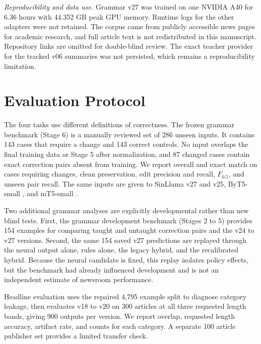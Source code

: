 \documentclass[a4paper,conference]{IEEEtran}
\begin{document}
\textit{Reproducibility and data use.} Grammar v27 was trained on one NVIDIA
A40 for 6.36 hours with 44.352 GB peak GPU memory. Runtime logs for the other
adapters were not retained. The corpus came from publicly accessible news pages
for academic research, and full article text is not redistributed in this
manuscript. Repository links are omitted for double-blind review. The exact
teacher provider for the tracked v06 summaries was not persisted, which remains
a reproducibility limitation.

\section{Evaluation Protocol}
\label{sec:evalprotocol}
The four tasks use different definitions of correctness. The frozen grammar benchmark (Stage 6) is a
manually reviewed set of 286 unseen inputs. It contains
143 cases that require a change and 143 correct controls. No input overlaps the
final training data or Stage 5 after normalization, and 87 changed cases contain
exact correction pairs absent from training. We report overall and
exact match on cases requiring changes, clean preservation, edit precision and recall,
$F_{0.5}$, and unseen pair recall. The same inputs are given to SinLlama v27 and
v25, ByT5-small \cite{xue2022byt5}, and mT5-small \cite{xue2021mt5}.

Two additional grammar analyses are explicitly developmental rather than new
blind tests. First, the grammar development benchmark (Stages 2 to 5) provides 154 examples
for comparing taught and untaught correction pairs and the v24 to v27 versions. Second, the
same 154 saved v27 predictions are replayed through the neural output alone, rules alone, the
legacy hybrid, and the recalibrated hybrid. Because the neural
candidate is fixed, this replay isolates policy effects, but the benchmark had
already influenced development and is not an independent estimate of newsroom
performance.

Headline evaluation uses the repaired 4,795 example split to diagnose category
leakage, then evaluates v18 to v20 on 300 articles at all three requested length
bands, giving 900 outputs per version. We report overlap, requested length
accuracy, artifact rate, and counts for each category. A separate 100 article
publisher set provides a limited transfer check.
\end{document}
